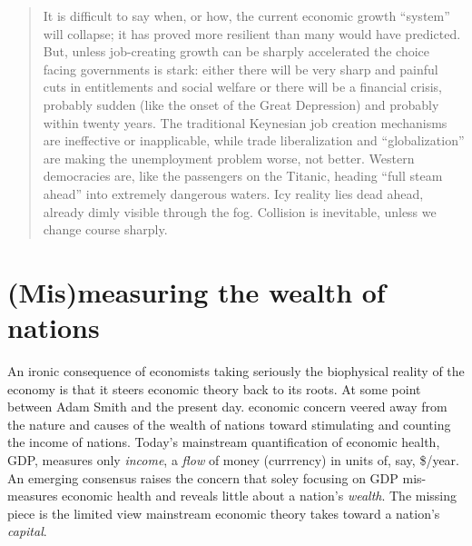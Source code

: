 \begin{quote}
	It is difficult to say when, or how, the current economic growth ``system'' will collapse;
	it has proved more resilient than many would have predicted. 
	But, unless job-creating growth can be sharply accelerated 
	the choice facing governments is stark: 
	either there will be very sharp and painful cuts 
	in entitlements and social welfare or there will be a financial crisis,
	probably sudden (like the onset of the Great Depression) and probably within twenty years. 
	The traditional Keynesian job creation mechanisms are ineffective or inapplicable, 
	while trade liberalization and ``globalization'' 
	are making the unemployment problem worse, not better.
	Western democracies are, 
	like the passengers on the Titanic, 
	heading ``full steam ahead'' into
	extremely dangerous waters. 
	Icy reality lies dead ahead, 
	already dimly visible through the fog.
	Collision is inevitable, 
	unless we change course sharply.\cite{Ayres:1996aa}
\end{quote}




\section{(Mis)measuring the wealth of nations}
\label{sec:wealth_nations}

An ironic consequence of economists taking  seriously
 the biophysical reality
of the economy is that it steers economic theory back to its roots.
At some point between Adam Smith and
the present day. economic concern veered away from 
the nature and causes of the wealth
of nations toward stimulating and counting the income of nations.
Today's mainstream quantification of economic health, GDP, 
measures only \emph{income}, a \emph{flow} of money (currrency) in units 
of, say, \$/year.  An emerging consensus raises the concern
that soley focusing on GDP mis-measures economic health
and reveals little about a nation's \emph{wealth}.
The missing piece is the limited view mainstream
economic theory takes toward a nation's \emph{capital}.


